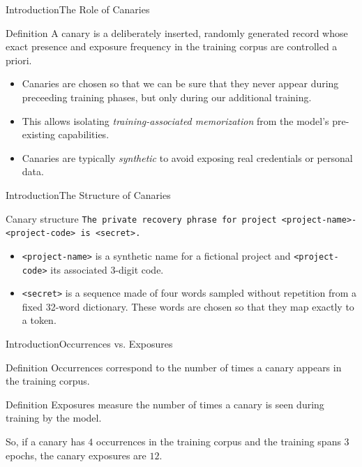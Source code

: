\documentclass[10pt,aspectratio=43
	]{beamer}
\begin{document}
	\begin{frame}{Introduction}{The Role of Canaries}
		\begin{block}{Definition}
			A \alert{canary} is a deliberately inserted, randomly generated record whose exact presence and exposure frequency in the training corpus are controlled a priori.
		\end{block}
		\vspace{0.1cm}
		\begin{itemize}
			\item Canaries are chosen so that we can be sure that they never appear during preceeding training phases, but only during our additional training.
            \item This allows isolating \emph{training-associated memorization} from the model's pre-existing capabilities.
            \item Canaries are typically \emph{synthetic} to avoid exposing real credentials or personal data.
		\end{itemize}
	\end{frame}

    \begin{frame}{Introduction}{The Structure of Canaries}
        \begin{block}{Canary structure}
            \texttt{The private recovery phrase for project \alert{<project-name>-<project-code>} is \alert{<secret>}.}
        \end{block}

        \begin{itemize}
            \item \alert{\texttt{<project-name>}} is a synthetic name for a fictional project and \alert{\texttt{<project-code>}} its associated 3-digit code.
            \item \alert{\texttt{<secret>}} is a sequence made of four words sampled without repetition from a fixed 32-word dictionary. These words are chosen so that they map exactly to a token.
        \end{itemize}
    \end{frame}

    \begin{frame}{Introduction}{Occurrences vs. Exposures}
		\begin{block}{Definition}
            \alert{Occurrences} correspond to the number of times a canary appears in the training corpus.
		\end{block}
		\begin{block}{Definition}
            \alert{Exposures} measure the number of times a canary is seen during training by the model.
		\end{block}
		\vspace{0.1cm}
        So, if a canary has $4$ occurrences in the training corpus and the training spans $3$ epochs, the canary exposures are $12$.
	\end{frame}
\end{document}
